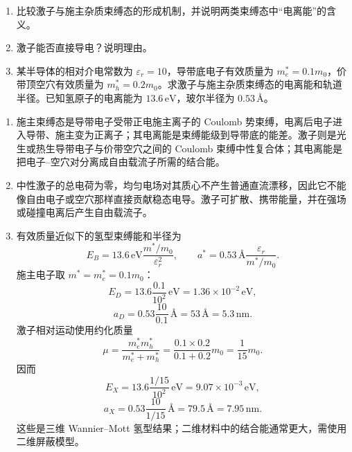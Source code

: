 \begin{question}[10 分]
\begin{enumerate}
  \item 比较激子与施主杂质束缚态的形成机制，并说明两类束缚态中“电离能”的含义。
  \item 激子能否直接导电？说明理由。
  \item 某半导体的相对介电常数为 $\varepsilon_r=10$，导带底电子有效质量为 $m_e^*=0.1m_0$，价带顶空穴有效质量为 $m_h^*=0.2m_0$。求激子与施主杂质束缚态的电离能和轨道半径。已知氢原子的电离能为 $13.6\,\mathrm{eV}$，玻尔半径为 $0.53\,\text{\AA}$。
\end{enumerate}


\begin{solution}
\begin{enumerate}
  \item 施主束缚态是导带电子受带正电施主离子的 Coulomb 势束缚，电离后电子进入导带、施主变为正离子；其电离能是束缚能级到导带底的能差。激子则是光生或热生导带电子与价带空穴之间的 Coulomb 束缚中性复合体；其电离能是把电子--空穴对分离成自由载流子所需的结合能。
  \item 中性激子的总电荷为零，均匀电场对其质心不产生普通直流漂移，因此它不能像自由电子或空穴那样直接贡献稳态电导。激子可扩散、携带能量，并在强场或碰撞电离后产生自由载流子。
  \item 有效质量近似下的氢型束缚能和半径为
  \[
    E_B=13.6\,\mathrm{eV}\frac{m^*/m_0}{\varepsilon_r^2},
    \qquad
    a^*=0.53\,\text{\AA}\frac{\varepsilon_r}{m^*/m_0}.
  \]
  施主电子取 $m^*=m_e^*=0.1m_0$：
  \[
    \boxed{E_D=13.6\frac{0.1}{10^2}\,\mathrm{eV}
    =1.36\times10^{-2}\,\mathrm{eV},}
  \]
  \[
    \boxed{a_D=0.53\frac{10}{0.1}\,\text{\AA}
    =53\,\text{\AA}=5.3\,\mathrm{nm}.}
  \]
  激子相对运动使用约化质量
  \[
    \mu=\frac{m_e^*m_h^*}{m_e^*+m_h^*}
    =\frac{0.1\times0.2}{0.1+0.2}m_0
    =\frac1{15}m_0.
  \]
  因而
  \[
    \boxed{E_X=13.6\frac{1/15}{10^2}\,\mathrm{eV}
    =9.07\times10^{-3}\,\mathrm{eV},}
  \]
  \[
    \boxed{a_X=0.53\frac{10}{1/15}\,\text{\AA}
    =79.5\,\text{\AA}=7.95\,\mathrm{nm}.}
  \]
  这些是三维 Wannier--Mott 氢型结果；二维材料中的结合能通常更大，需使用二维屏蔽模型。
\end{enumerate}
\end{solution}
\end{question}

